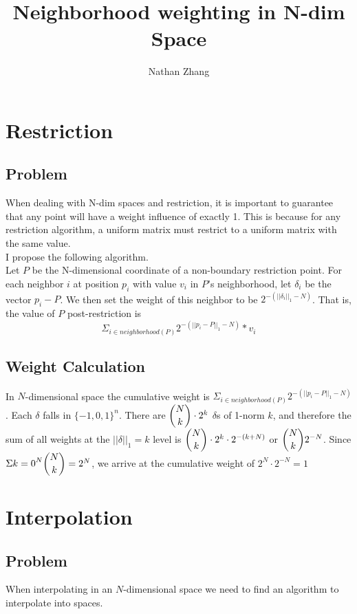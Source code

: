 \documentclass[11pt, oneside]{article}   	%
\title{Neighborhood weighting in N-dim Space}
\author{Nathan Zhang}
\begin{document}
\maketitle

\section{Restriction}
\subsection{Problem}
When dealing with N-dim spaces and restriction, it is important to guarantee that any point will have a weight influence of exactly 1. This is because for any restriction algorithm, a uniform matrix must restrict to a uniform matrix with the same value.\\

I propose the following algorithm.\\
Let $P$ be the N-dimensional coordinate of a non-boundary restriction point. For each neighbor $i$ at position $p_i$ with value $v_i$ in $P$'s neighborhood, let $\delta_i$ be the vector $p_i - P$. We then set the weight of this neighbor to be $2^{-(||\delta_i||_1 - N)}$. That is, the value of $P$ post-restriction is $$\Sigma_{i \in neighborhood(P)} 2^{-(||p_i - P||_1 - N)} * v_i$$

\subsection{Weight Calculation}
In $N$-dimensional space the cumulative weight is $\Sigma_{i \in neighborhood(P)} 2^{-(||p_i - P||_1 - N)}$. Each $\delta$ falls in $\{-1, 0, 1\}^n$. There are $\dbinom{N}{k} \cdot 2^k$ $\delta$s of 1-norm $k$, and therefore the sum of all weights at the $||\delta||_1=k$ level is $\dbinom{N}{k} \cdot 2^k \cdot 2^{-(k+N)}$ or $\dbinom{N}{k}2^{-N}$. Since $\Sigma{k=0}^{N} \dbinom{N}{k} = 2^N$, we arrive at the cumulative weight of $2^N \cdot 2^{-N} = 1$

\section{Interpolation}
\subsection{Problem}
When interpolating in an $N$-dimensional space we need to find an algorithm to interpolate into spaces.\\
\end{document}
